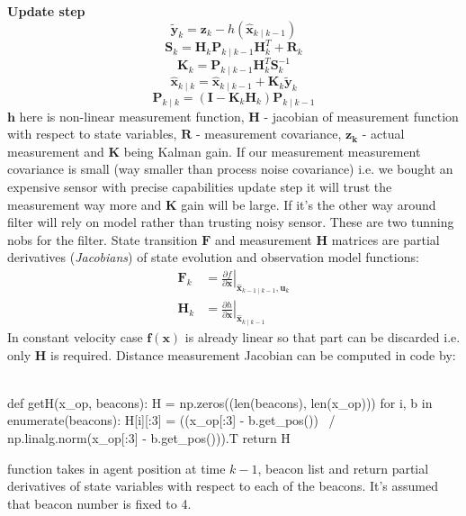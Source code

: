 \textbf{Update step} \smallskip
$$\tilde{\boldsymbol{y}}_k=\boldsymbol{z}_k-h\left(\hat{\boldsymbol{x}}_{k \mid k-1}\right)$$
$$\boldsymbol{S}_k=\boldsymbol{H}_k \boldsymbol{P}_{k \mid k-1} \boldsymbol{H}_k^T+\boldsymbol{R}_k$$
$$\boldsymbol{K}_k=\boldsymbol{P}_{k \mid k-1} \boldsymbol{H}_k^T \boldsymbol{S}_k^{-1}$$
$$\hat{\boldsymbol{x}}_{k \mid k}=\hat{\boldsymbol{x}}_{k \mid k-1}+\boldsymbol{K}_k \tilde{\boldsymbol{y}}_k$$
$$\boldsymbol{P}_{k \mid k}=\left(\boldsymbol{I}-\boldsymbol{K}_k \boldsymbol{H}_k\right) \boldsymbol{P}_{k \mid k-1}$$
$\boldsymbol{h}$ here is non-linear measurement function, $\boldsymbol{H}$ - jacobian of measurement function with respect to state variables, $\boldsymbol{R}$ - measurement covariance, $\boldsymbol{z_k}$ - actual measurement and $\boldsymbol{K}$ being Kalman gain. If our measurement measurement covariance is small (way smaller than process noise covariance) i.e. we bought an expensive sensor with precise capabilities update step it will trust the measurement way more and $\boldsymbol{K}$ gain will be large. If it's the other way around filter will rely on model rather than trusting noisy sensor. These are two tunning nobs for the filter. State transition $\boldsymbol{F}$ and measurement $\boldsymbol{H}$ matrices are partial derivatives (\emph{Jacobians}) of state evolution and observation model functions:
$$
    \begin{aligned}
        \boldsymbol{F}_k & =\left.\frac{\partial f}{\partial \boldsymbol{x}}\right|_{\hat{\boldsymbol{x}}_{k-1 \mid k-1}, \boldsymbol{u}_k} \\
        \boldsymbol{H}_k & =\left.\frac{\partial h}{\partial \boldsymbol{x}}\right|_{\hat{\boldsymbol{x}}_{k \mid k-1}}
    \end{aligned}
$$
In constant velocity case $\boldsymbol{f}(\boldsymbol{x})$ is already linear so that part can be discarded i.e. only $\boldsymbol{H}$ is required. Distance measurement Jacobian can be computed in code by:
\\
\\
\begin{minipage}{\linewidth}
    \begin{python}
    def getH(x_op, beacons):
        H = np.zeros((len(beacons), len(x_op)))
        for i, b in enumerate(beacons):
        H[i][:3] = ((x_op[:3] - b.get_pos()) \
            / np.linalg.norm(x_op[:3] - b.get_pos())).T
        return H
    \end{python}
\end{minipage}
function takes in agent position at time $k-1$, beacon list and return partial derivatives of state variables with respect to each of the beacons. It's assumed that beacon number is fixed to 4.

